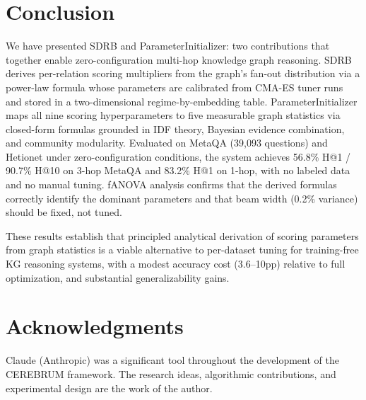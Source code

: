 \documentclass[11pt,a4paper]{article}
\begin{document}
\section{Conclusion}
\label{sec:conclusion}

We have presented SDRB and ParameterInitializer: two contributions that
together enable zero-configuration multi-hop knowledge graph reasoning.
SDRB derives per-relation scoring multipliers from the graph's fan-out
distribution via a power-law formula whose parameters are calibrated from
CMA-ES tuner runs and stored in a two-dimensional regime-by-embedding table.
ParameterInitializer maps all nine scoring hyperparameters to five measurable
graph statistics via closed-form formulas grounded in IDF theory, Bayesian
evidence combination, and community modularity.
Evaluated on MetaQA (39,093 questions) and Hetionet under zero-configuration
conditions, the system achieves 56.8\% H@1 / 90.7\% H@10 on 3-hop MetaQA
and 83.2\% H@1 on 1-hop, with no labeled data and no manual tuning.
fANOVA analysis confirms that the derived formulas correctly identify the
dominant parameters and that beam width (0.2\% variance) should be fixed,
not tuned.

These results establish that principled analytical derivation of scoring
parameters from graph statistics is a viable alternative to per-dataset
tuning for training-free KG reasoning systems, with a modest accuracy cost
(3.6--10pp) relative to full optimization, and substantial generalizability
gains.

\section*{Acknowledgments}

Claude (Anthropic) was a significant tool throughout the development of the
CEREBRUM framework. The research ideas, algorithmic contributions, and
experimental design are the work of the author.
\end{document}
